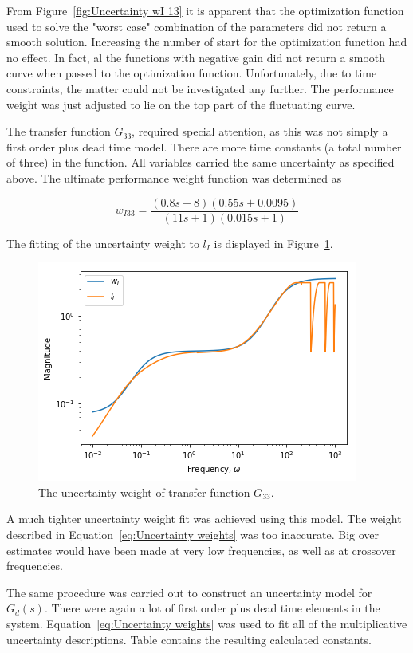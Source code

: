 From Figure~\ref{fig:Uncertainty wI 13} it is apparent that the optimization function used to solve the "worst case" combination of the parameters did not return a smooth solution. Increasing the number of start for the optimization function had no effect. In fact, al the functions with negative gain did not return a smooth curve when passed to the optimization function. Unfortunately, due to time constraints, the matter could not be investigated any further. The performance weight was just adjusted to lie on the top part of the fluctuating curve.

The transfer function $G_{33}$, required special attention, as this was not simply a first order plus dead time model. There are more time constants (a total number of three) in the function. All variables carried the same uncertainty as specified above. The ultimate performance weight function was determined as

\begin{equation}
	w_{I33} = \frac{(0.8s + 8)(0.55s + 0.0095)}{(11s + 1)(0.015s + 1)}
\end{equation}

The fitting of the uncertainty weight to $l_I$ is displayed in Figure~\ref{fig:uncertaintywi33}.

\begin{figure}[H]
	\centering
	\includegraphics[width=0.7\linewidth]{Figures/Uncertainty_wI_33}
	\caption{The uncertainty weight of transfer function $G_{33}$.}
	\label{fig:uncertaintywi33}
\end{figure}

A much tighter uncertainty weight fit was achieved using this model. The weight described in Equation~\ref{eq:Uncertainty weights} was too inaccurate. Big over estimates would have been made at very low frequencies, as well as at crossover frequencies.

The same procedure was carried out to construct an uncertainty model for $G_d(s)$. There were again a lot of first order plus dead time elements in the system. Equation~\ref{eq:Uncertainty weights} was used to fit all of the multiplicative uncertainty descriptions. Table contains the resulting calculated constants.

